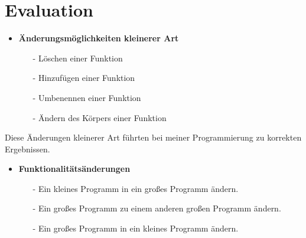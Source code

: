\chapter{Evaluation}
\begin{itemize}
\item \textbf{Änderungsmöglichkeiten kleinerer Art}
\begin{itemize}
\item[-] Löschen einer Funktion
\item[-] Hinzufügen einer Funktion
\item[-] Umbenennen einer Funktion
\item[-] Ändern des Körpers einer Funktion 
\end{itemize}
\end{itemize}
Diese Änderungen kleinerer Art führten bei meiner Programmierung zu korrekten Ergebnissen.
\begin{itemize}
\item \textbf{Funktionalitätsänderungen}
\begin{itemize}
\item[-] Ein kleines Programm in ein großes Programm ändern.
\item[-] Ein großes Programm zu einem anderen großen Programm ändern.
\item[-] Ein großes Programm in ein kleines Programm ändern.
\end{itemize}
\end{itemize}
